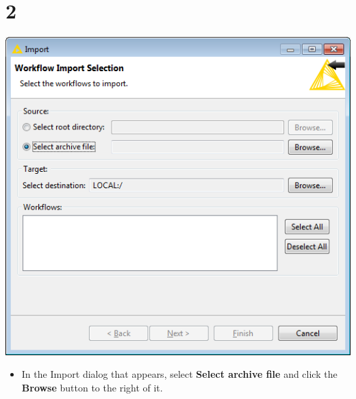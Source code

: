 \documentclass{beamer}
\begin{document}
\section{2}
\begin{frame}
	\begin{center}
  		\includegraphics[height=0.6\textheight]{2.png}
	\end{center}
	\begin{itemize}
		\item In the Import dialog that appears, select \textbf{Select archive file} and click the \textbf{Browse} button to the right of it.
	\end{itemize}
\end{frame}
\end{document}
